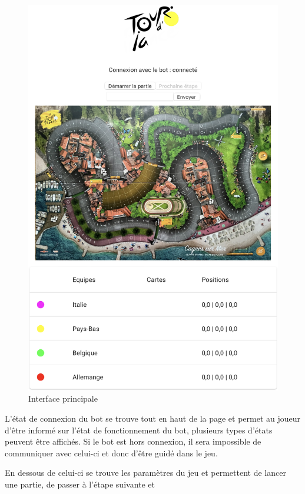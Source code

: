 \documentclass[a4paper, 11pt]{article}
\begin{document}
\begin{figure}[!h]
	\centering
	\includegraphics[scale=.5]{assets/interface-1.png}
	\caption{Interface principale}
\end{figure}

\newpage

L'état de connexion du bot se trouve tout en haut de la page et permet au joueur d'être informé sur l'état de fonctionnement du bot, plusieurs types d'états peuvent être affichés. Si le bot est hors connexion, il sera impossible de communiquer avec celui-ci et donc d'être guidé dans le jeu.\newline

En dessous de celui-ci se trouve les paramètres du jeu et permettent de lancer une partie, de passer à l'étape suivante et \newline
\end{document}
